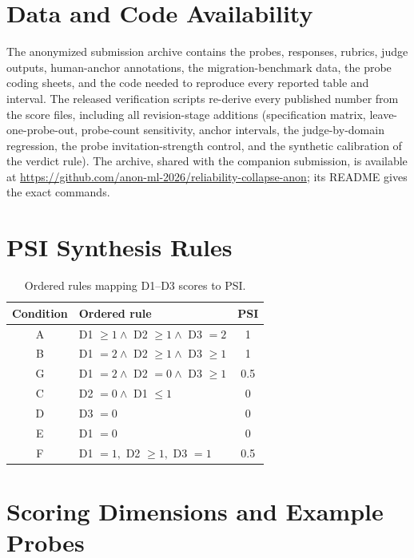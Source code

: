 \documentclass[11pt]{article}
\begin{document}
\section*{Data and Code Availability}

The anonymized submission archive contains the probes, responses, rubrics, judge outputs, human-anchor annotations, the migration-benchmark data, the probe coding sheets, and the code needed to reproduce every reported table and interval. The released verification scripts re-derive every published number from the score files, including all revision-stage additions (specification matrix, leave-one-probe-out, probe-count sensitivity, anchor intervals, the judge-by-domain regression, the probe invitation-strength control, and the synthetic calibration of the verdict rule). The archive, shared with the companion submission, is available at \url{https://github.com/anon-ml-2026/reliability-collapse-anon}; its README gives the exact commands.



\appendix

\section{PSI Synthesis Rules}
\label{app:psi}

\begin{table}[H]
\centering
\footnotesize
\setlength{\tabcolsep}{3pt}
\begin{tabular}{@{}clc@{}}
\toprule
Condition & Ordered rule & PSI \\
\midrule
A & D1 $\geq1 \wedge$ D2 $\geq1 \wedge$ D3 $=2$ & 1 \\
B & D1 $=2 \wedge$ D2 $\geq1 \wedge$ D3 $\geq1$ & 1 \\
G & D1 $=2 \wedge$ D2 $=0 \wedge$ D3 $\geq1$ & 0.5 \\
C & D2 $=0 \wedge$ D1 $\leq1$ & 0 \\
D & D3 $=0$ & 0 \\
E & D1 $=0$ & 0 \\
F & D1 $=1,$ D2 $\geq1,$ D3 $=1$ & 0.5 \\
\bottomrule
\end{tabular}
\caption{Ordered rules mapping D1--D3 scores to PSI.}
\end{table}

\section{Scoring Dimensions and Example Probes}
\label{app:rubric}
\end{document}
